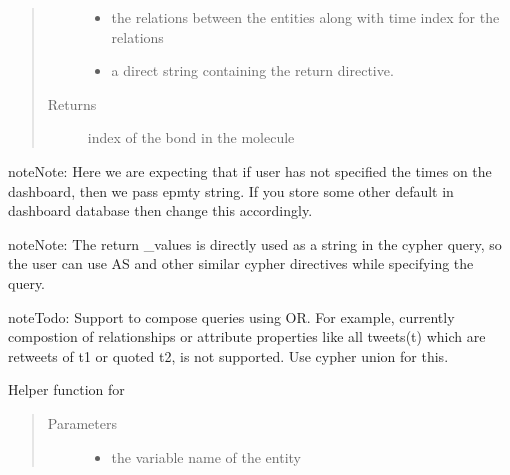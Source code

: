 \documentclass[letterpaper,10pt,english]{sphinxmanual}
\begin{document}
\begin{fulllineitems}
\begin{fulllineitems}
\begin{quote}
\begin{description}
\begin{itemize}
\item {} 
 \textendash{} the relations between the entities along with time index for the relations

\item {} 
 \textendash{} a direct string containing the return directive.

\end{itemize}

\item[{Returns}] \leavevmode
index of the bond in the molecule

\end{description}\end{quote}

\begin{sphinxadmonition}{note}{Note:}
Here we are expecting that if user has not specified the times on the dashboard, then we pass epmty string. If you
store some other default in dashboard database then change this accordingly.
\end{sphinxadmonition}

\begin{sphinxadmonition}{note}{Note:}
The return \_values is directly used as a string in the cypher query, so the user can use AS and other similar cypher directives while specifying the query.
\end{sphinxadmonition}

\begin{sphinxadmonition}{note}{Todo:}
Support to compose queries using OR. For example, currently compostion of relationships or attribute properties like all tweets(t) which are retweets of t1 or quoted t2, is not supported. Use cypher union for this.
\end{sphinxadmonition}

\end{fulllineitems}


\begin{fulllineitems}
\label{\detokenize{neo4j_query_generation:generate_queries.CreateQuery.generate_node}}
Helper function for {\hyperref[\detokenize{neo4j_query_generation:generate_queries.CreateQuery.conditional_create}]{}}
\begin{quote}\begin{description}
\item[{Parameters}] \leavevmode\begin{itemize}
\item {} 
 \textendash{} the variable name of the entity


\end{itemize}
\end{description}
\end{quote}
\end{fulllineitems}
\end{fulllineitems}
\end{document}
